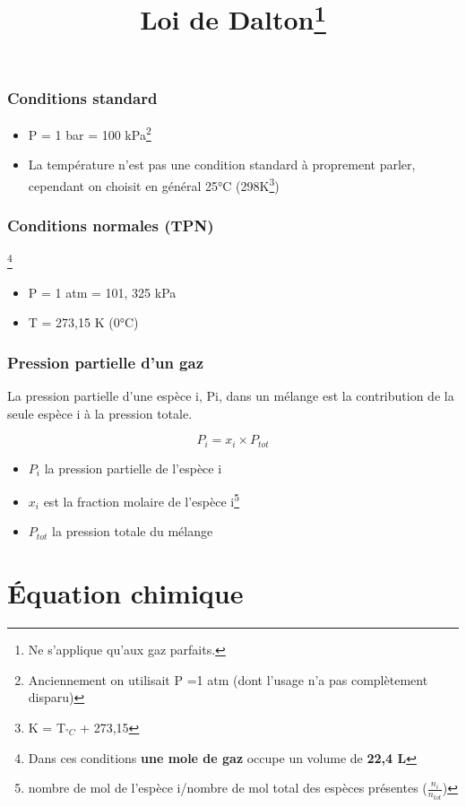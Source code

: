 \documentclass[10pt,a4paper]{book}
\begin{document}
\subsubsection{Conditions standard} \label{condStands}
\begin{itemize}
\item P = 1 bar = 100 kPa\footnote{Anciennement on utilisait P =1 atm (dont l'usage n'a pas complètement disparu)}
\item La température n'est pas une condition standard à proprement parler, cependant on choisit en général 25°C (298K\footnote{K = T$_{ °C}$ + 273,15})
\end{itemize}

\subsubsection{Conditions normales (TPN)}\footnote{Dans ces conditions \textbf{une mole de gaz} occupe un volume de \textbf{22,4 L}}

\begin{itemize}
\item P = 1 atm = 101, 325 kPa
\item T = 273,15 K (0°C)
\end{itemize}

\subsubsection{Pression partielle d'un gaz}

La pression partielle d'une espèce i, Pi, dans un mélange est la contribution de la seule
espèce i à la pression totale.
\begin{center}
\title{Loi de Dalton\footnote{Ne s'applique qu'aux gaz parfaits.}}
\end{center}
\begin{displaymath}
P_i = x_i \times P_{tot}
\end{displaymath}

\begin{itemize}
\item $P_i$ la pression partielle de l'espèce i
\item $x_i$ est la fraction molaire de l'espèce i\footnote{nombre de mol de l'espèce i/nombre de mol total des espèces présentes ($\frac{n_i}{n_{tot}}$)}
\item $P_{tot}$ la pression totale du mélange
\end{itemize}
\newpage

\section{Équation chimique} 
\end{document}
